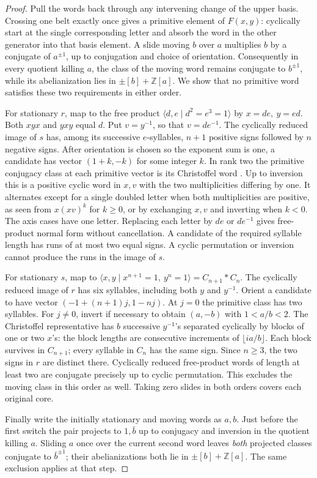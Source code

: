 \documentclass[11pt,letterpaper]{article}
\numberwithin{equation}{section}
\theoremstyle{remark}
\begin{document}
\begin{proof}
Pull the words back through any intervening change of the upper basis.
Crossing one belt exactly once gives a primitive element of \(F(x,y)\):
cyclically start at the single corresponding letter and absorb the
word in the other generator into that basis element. A slide moving
\(b\) over \(a\) multiplies \(b\) by a conjugate of \(a^{\pm1}\), up to
conjugation and choice of orientation. Consequently in every quotient
killing \(a\), the class of the moving word remains conjugate to
\(b^{\pm1}\), while its abelianization lies in
\(\pm[b]+\mathbb Z[a]\). We show that no primitive word satisfies
these two requirements in either order.

For stationary \(r\), map to the free product
\(\langle d,e\mid d^2=e^3=1\rangle\) by \(x=de,\ y=ed\).
Both \(xyx\) and \(yxy\) equal \(d\). Put \(v=y^{-1}\), so that
\(v=de^{-1}\). The cyclically reduced image of \(s\) has, among its
successive \(e\)-syllables, \(n+1\) positive signs followed by \(n\)
negative signs. After orientation is chosen so the exponent sum is one,
a candidate has vector \((1+k,-k)\) for some integer \(k\).
In rank two the primitive conjugacy class at each primitive vector
is its Christoffel word \cite[\S3, Corollary 3.3(b)]{KasselReutenauer2007}.
Up to inversion this is a positive cyclic word in \(x,v\) with the
two multiplicities differing by one. It alternates except for a
single doubled letter when both multiplicities are positive, as seen
from \(x(xv)^k\) for \(k\ge0\), or by exchanging \(x,v\) and inverting
when \(k<0\). The axis cases have one letter. Replacing each letter
by \(de\) or \(de^{-1}\) gives free-product normal form without
cancellation. A candidate of the required syllable length has runs of
at most two equal signs. A cyclic permutation or inversion cannot
produce the runs in the image of \(s\).

For stationary \(s\), map to
\(\langle x,y\mid x^{n+1}=1,\ y^n=1\rangle=C_{n+1}*C_n\).
The cyclically reduced image of \(r\) has six syllables, including
both \(y\) and \(y^{-1}\). Orient a candidate to have vector
\((-1+(n+1)j,1-nj)\). At \(j=0\) the primitive class has two
syllables. For \(j\ne0\), invert if necessary to obtain
\((a,-b)\) with \(1<a/b<2\). The Christoffel representative has
\(b\) successive \(y^{-1}\)'s separated cyclically by blocks of one
or two \(x\)'s: the block lengths are consecutive increments of
\(\lfloor ia/b\rfloor\). Each block survives in \(C_{n+1}\);
every syllable in \(C_n\) has the same sign. Since \(n\ge3\),
the two signs in \(r\) are distinct there. Cyclically reduced
free-product words of length at least two are conjugate precisely
up to cyclic permutation. This excludes the moving class in this order
as well. Taking zero slides in both orders covers each original core.

Finally write the initially stationary and moving words as \(a,b\).
Just before the first switch the pair projects to \(1,\bar b\) up to
conjugacy and inversion in the quotient killing \(a\). Sliding \(a\)
once over the current second word leaves \emph{both} projected classes
conjugate to \(\bar b^{\pm1}\); their abelianizations both lie in
\(\pm[b]+\mathbb Z[a]\). The same exclusion applies at that step.
\end{proof}
\end{document}

